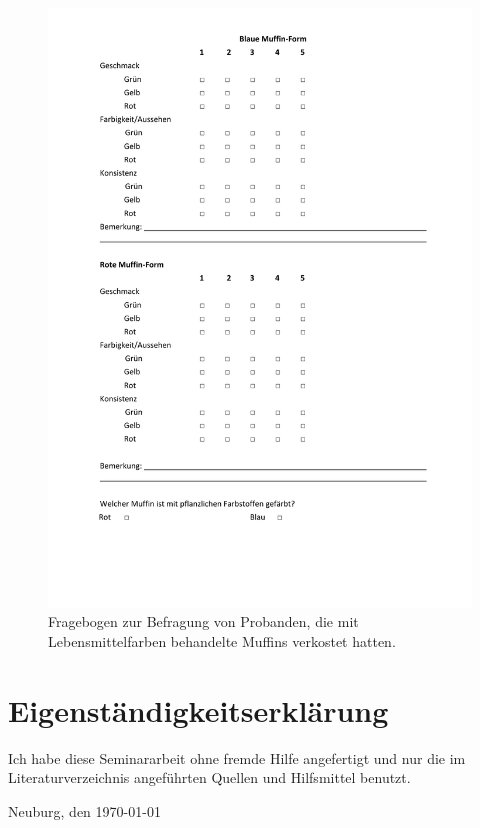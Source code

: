 \documentclass[11pt]{scrreprt}
\begin{document}
\begin{figure}[htbp]
	\centering
	\includegraphics[width=\textwidth]{Fragebogen.pdf}
	\caption{Fragebogen zur Befragung von Probanden, die mit Lebensmittelfarben behandelte Muffins verkostet hatten.}
	\label{img:questions}
\end{figure}


\printbibliography


\chapter*{Eigenständigkeitserklärung}

Ich habe diese Seminararbeit ohne fremde Hilfe angefertigt und nur die im Literaturverzeichnis angeführten Quellen und Hilfsmittel benutzt.

\vspace{2\baselineskip}
\noindent Neuburg, den \today
\par\noindent\makebox[2.5in]{} \hfill\makebox[2.0in]{\hrulefill}%
\par\noindent\makebox[2.5in][l]{} \hfill{}
\end{document}
